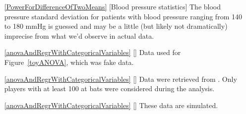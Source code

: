 \begin{itemize}
\item[\ref{PowerForDifferenceOfTwoMeans}]
    [Blood pressure statistics]
    The blood pressure standard deviation for patients
    with blood pressure ranging from 140 to 180 mmHg
    is guessed and may be a little (but likely not dramatically)
    imprecise from what we'd observe in actual data.

\item[\ref{anovaAndRegrWithCategoricalVariables}]
    [\datalink{toy\_anova}]
    Data used for Figure~\ref{toyANOVA}, which was fake data.
\item[\ref{anovaAndRegrWithCategoricalVariables}]
    [\datalink{mlb\_players\_18}]
    Data were retrieved from
    .
    Only players with at least 100 at bats were considered
    during the analysis.
\item[\ref{anovaAndRegrWithCategoricalVariables}]
    [\datalink{class\_data}]
    These data are simulated.

\end{itemize}






\section{}
\label{ch_regr_simple_linear_data}

